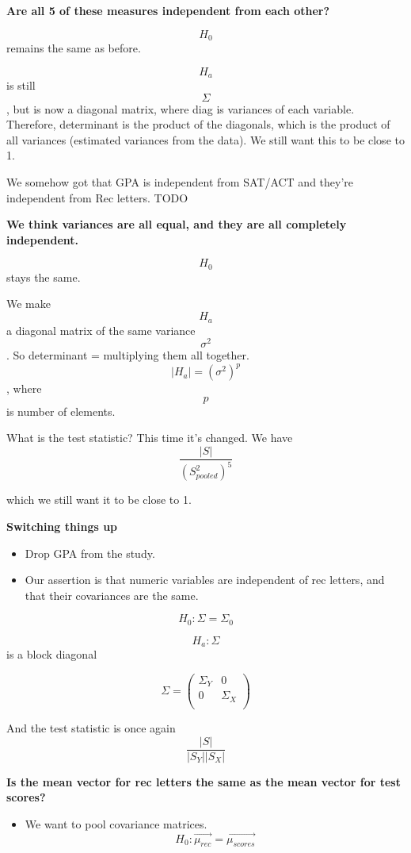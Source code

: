 \documentclass[]{article}
\providecommand{\tightlist}{%
  \setlength{\itemsep}{0pt}\setlength{\parskip}{0pt}}
\begin{document}
\textbf{Are all 5 of these measures independent from each other?}

\[H_0\] remains the same as before.

\[H_a\] is still \[\Sigma\], but is now a diagonal matrix, where diag is
variances of each variable. Therefore, determinant is the product of the
diagonals, which is the product of all variances (estimated variances
from the data). We still want this to be close to 1.

We somehow got that GPA is independent from SAT/ACT and they're
independent from Rec letters. TODO

\textbf{We think variances are all equal, and they are all completely
independent.}

\[H_0\] stays the same.

We make \[H_a\] a diagonal matrix of the same variance \[\sigma^2\]. So
determinant = multiplying them all together.
\[ | H_a | = (\sigma^2)^p \], where \[p\] is number of elements.

What is the test statistic? This time it's changed. We have
\[\frac{| S |}{(S_{pooled}^2)^5}\]

which we still want it to be close to 1.

\textbf{Switching things up}

\begin{itemize}
\tightlist
\item
  Drop GPA from the study.
\item
  Our assertion is that numeric variables are independent of rec
  letters, and that their covariances are the same.
\end{itemize}

\[H_0: \Sigma = \Sigma_0\]

\[H_a: \Sigma\] is a block diagonal

\[\Sigma = \left(\begin{array}{c} \Sigma_Y & 0 \\ 0 & \Sigma_X \\ \end{array} \right)\]

And the test statistic is once again \[\frac{| S |}{| S_Y | | S_X |}\]

\textbf{Is the mean vector for rec letters the same as the mean vector
for test scores?}

\begin{itemize}
\tightlist
\item
  We want to pool covariance matrices.
  \[H_0: \overrightarrow{\mu_{rec}} = \overrightarrow{\mu_{scores}}\]
\end{itemize}
\end{document}
